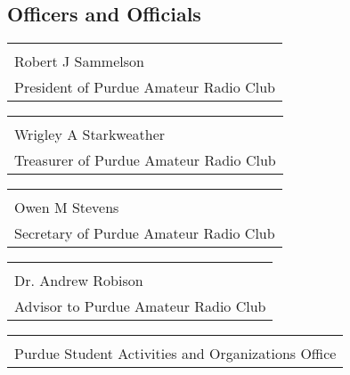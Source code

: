 \documentclass{article}
\begin{document}
\vspace{6ex}

\subsection*{Officers and Officials}

\vspace{10ex}

\begin{tabular}{@{}p{3.5in}@{}}
\hrulefill \\
Robert J Sammelson \\
President of Purdue Amateur Radio Club \\
\end{tabular}

\vspace{8ex}

\noindent
\begin{tabular}{@{}p{3.5in}@{}}
\hrulefill \\
Wrigley A Starkweather \\
Treasurer of Purdue Amateur Radio Club \\
\end{tabular}

\vspace{8ex}

\noindent
\begin{tabular}{@{}p{3.5in}@{}}
\hrulefill \\
Owen M Stevens \\
Secretary of Purdue Amateur Radio Club \\
\end{tabular}

\vspace{8ex}

\noindent
\begin{tabular}{@{}p{3.5in}@{}}
\hrulefill \\
Dr. Andrew Robison \\
Advisor to Purdue Amateur Radio Club \\
\end{tabular}

\vspace{8ex}

\noindent
\begin{tabular}{@{}p{3.5in}@{}}
\hrulefill \\
Purdue Student Activities and Organizations Office \\
\end{tabular}
\end{document}
